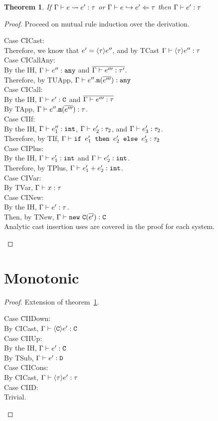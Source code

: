 \documentclass{report}
\newtheorem{thm}{Theorem}
\begin{document}
\begin{thm} 
\label{cisnd}If $\Gamma\vdash e \rightsquigarrow e' : \tau$ or $\Gamma\vdash e\hookrightarrow e' \Leftarrow \tau$ then $\Gamma\vdash e' : \tau$\end{thm}
\begin{proof}
Proceed on mutual rule induction over the derivation.
\begin{tabbing}
Case \=CICast:\\
\> Therefore, we know that $e' = \langle \tau\rangle e''$, and by TCast $\Gamma\vdash \langle \tau\rangle e'' : \tau$\\
Case CICallAny:\\
\> By the IH, $\Gamma\vdash e'' : \texttt{any}$ and $\overline{ \Gamma\vdash e''' : \tau'} $.\\
\> Therefore, by TUApp, $\Gamma\vdash e''.\texttt{m}(\overline{ e'''} ) : \texttt{any}$\\
Case CICall:\\
\> By the IH, $\Gamma\vdash e' : \texttt{C}$ and $\overline{ \Gamma\vdash e''' : \tau} $\\
\> By TApp, $\Gamma\vdash e''.\texttt{m}(\overline{ e'''} ) : \tau$.\\
Case CIIf:\\
\> By the IH, $\Gamma\vdash e_1'' : \texttt{int}$, $\Gamma\vdash e_2' : \tau_2$, and $\Gamma\vdash e_3' : \tau_2$.\\
\> Therefore, by TIf, $\Gamma\vdash \texttt{if }e_1'\texttt{ then }e_2'\texttt{ else }e_3' : \tau_2$\\
Case CIPlus:\\
\> By the IH, $\Gamma\vdash e_1' : \texttt{int}$ and $\Gamma\vdash e_2' : \texttt{int}$.\\
\> Therefore, by TPlus, $\Gamma\vdash e_1' + e_2' : \texttt{int}$.\\
Case CIVar:\\
\> By TVar, $\Gamma\vdash x:\tau$\\
Case CINew:\\
\> By the IH, $\Gamma\vdash e' : \tau$.\\
\> Then, by TNew, $\Gamma\vdash  \texttt{new} ~ \texttt{C} ( \overline{ e'}  ) : \texttt{C}$ \\
Analytic cast insertion uses are covered in the proof for each system.\\
\end{tabbing}
\end{proof}


\section{Monotonic}

\begin{proof}

Extension of theorem~\ref{cisnd}.
\begin{tabbing}
Case \=CIIDown:\\
\> By CICast, $\Gamma\vdash \langle \texttt{C}\rangle e' : \texttt{C}$\\
Case CIIUp:\\
\> By the IH, $\Gamma\vdash e' : \texttt{C}$\\
\> By TSub, $\Gamma\vdash e' : \texttt{D}$\\
Case CIICons:\\
\> By CICast, $\Gamma\vdash \langle \tau\rangle e' : \tau$\\
Case CIID:\\
\> Trivial.\\
\end{tabbing}
\end{proof}
\end{document}
